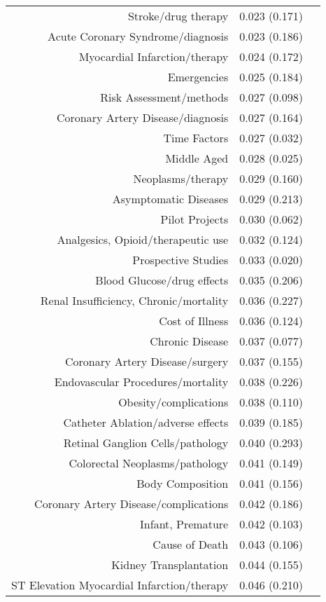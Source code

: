 \begin{longtable}[l]{rr@{}l@{ }}
Stroke/drug therapy & 0.023 (0.171) & $^{}$\\
Acute Coronary Syndrome/diagnosis & 0.023 (0.186) & $^{}$\\
Myocardial Infarction/therapy & 0.024 (0.172) & $^{}$\\
Emergencies & 0.025 (0.184) & $^{}$\\
Risk Assessment/methods & 0.027 (0.098) & $^{}$\\
Coronary Artery Disease/diagnosis & 0.027 (0.164) & $^{}$\\
Time Factors & 0.027 (0.032) & $^{}$\\
Middle Aged & 0.028 (0.025) & $^{}$\\
Neoplasms/therapy & 0.029 (0.160) & $^{}$\\
Asymptomatic Diseases & 0.029 (0.213) & $^{}$\\
Pilot Projects & 0.030 (0.062) & $^{}$\\
Analgesics, Opioid/therapeutic use & 0.032 (0.124) & $^{}$\\
Prospective Studies & 0.033 (0.020) & $^{}$\\
Blood Glucose/drug effects & 0.035 (0.206) & $^{}$\\
Renal Insufficiency, Chronic/mortality & 0.036 (0.227) & $^{}$\\
Cost of Illness & 0.036 (0.124) & $^{}$\\
Chronic Disease & 0.037 (0.077) & $^{}$\\
Coronary Artery Disease/surgery & 0.037 (0.155) & $^{}$\\
Endovascular Procedures/mortality & 0.038 (0.226) & $^{}$\\
Obesity/complications & 0.038 (0.110) & $^{}$\\
Catheter Ablation/adverse effects & 0.039 (0.185) & $^{}$\\
Retinal Ganglion Cells/pathology & 0.040 (0.293) & $^{}$\\
Colorectal Neoplasms/pathology & 0.041 (0.149) & $^{}$\\
Body Composition & 0.041 (0.156) & $^{}$\\
Coronary Artery Disease/complications & 0.042 (0.186) & $^{}$\\
Infant, Premature & 0.042 (0.103) & $^{}$\\
Cause of Death & 0.043 (0.106) & $^{}$\\
Kidney Transplantation & 0.044 (0.155) & $^{}$\\
ST Elevation Myocardial Infarction/therapy & 0.046 (0.210) & $^{}$\\

\end{longtable}
